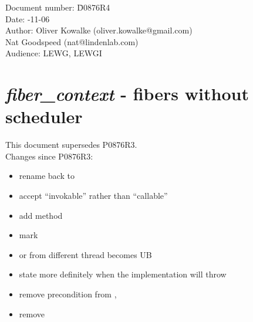\documentclass[fontsize=10pt,paper=A4,pagesize,DIV=15]{scrartcl}
\begin{document}
\small
\begin{tabbing}
    Document number: \= D0876R4\\
    Date:            -11-06\\
    Author:          \> Oliver Kowalke (oliver.kowalke@gmail.com)\\
                     \> Nat Goodspeed (nat@lindenlab.com)\\
    Audience:        \> LEWG, LEWGI\\
\end{tabbing}

\section*{\emph{fiber\_context} - fibers without scheduler}


\tableofcontents


This document supersedes P0876R3.\\
\newline
Changes since P0876R3:

\begin{itemize}
    \item rename  back to 
    \item accept ``invokable'' rather than ``callable''
    \item add  method
    \item mark \xspace\cpp{[[noreturn]]}
    \item {} or  from different thread becomes UB
    \item state more definitely when the implementation will throw
    \item remove precondition from , 
    \item remove 
\end{itemize}
























\end{document}
